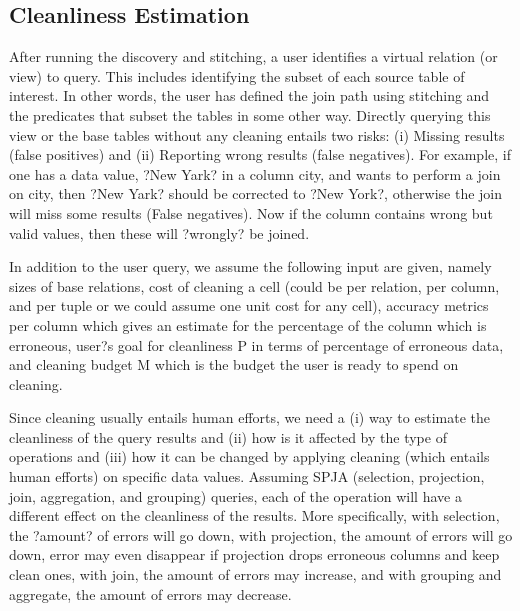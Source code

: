 \subsection{Cleanliness Estimation}
\label{sec:cleanliness}

After running the  discovery and stitching, a user identifies a virtual relation
(or view) to query.  This includes identifying the subset of each source table
of interest.  In other words, the user has defined the join path using stitching
and the predicates that subset the tables in some other way.   Directly querying
this view or the base tables without any cleaning entails two risks: (i) Missing
results (false positives) and (ii) Reporting wrong results (false negatives).
For example,  if one has a data value, ?New Yark? in a column city, and wants to
perform a join on city, then ?New Yark? should be corrected to ?New York?,
otherwise the join will miss some results (False negatives). Now if the column
contains wrong but valid values, then these will ?wrongly? be joined. 

In addition to the user query, we assume the following input are given, namely
sizes of base relations, cost of cleaning a cell (could be per relation, per
column, and per tuple or we could assume one unit cost for any cell),  accuracy
metrics per column which gives an estimate for the percentage of the column
which is erroneous,  user?s goal for cleanliness P in terms of percentage of
erroneous data,  and cleaning budget M which is the budget the user is ready to
spend on cleaning.

Since cleaning usually entails human efforts, we need a (i) way to estimate the
cleanliness of the query results and (ii) how is it affected by the type of
operations and (iii) how it can be changed by applying cleaning (which entails
human efforts) on specific data values. Assuming SPJA (selection, projection,
join, aggregation, and grouping) queries, each of the operation will have a
different effect on the cleanliness of the results. More specifically,  with
selection, the ?amount? of errors will go down, with projection,  the amount of
errors will go down, error may even disappear if projection drops erroneous
columns and keep clean ones, with join, the amount of errors may increase, and
with grouping and aggregate, the amount of errors may decrease. 

